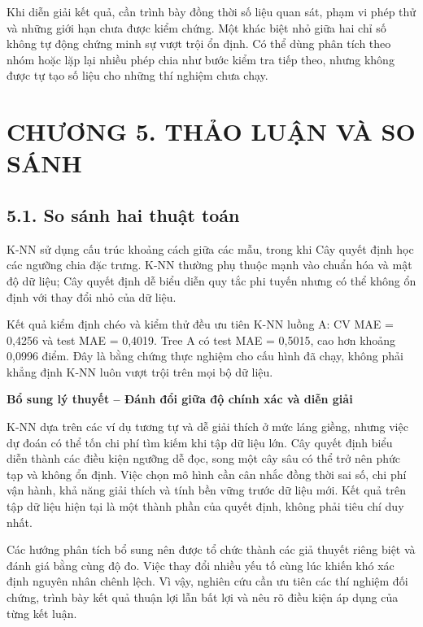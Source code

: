 \documentclass[12pt,a4paper,oneside]{article}
\begin{document}
Khi diễn giải kết quả, cần trình bày đồng thời số liệu quan sát, phạm vi phép thử và những giới hạn chưa được kiểm chứng. Một khác biệt nhỏ giữa hai chỉ số không tự động chứng minh sự vượt trội ổn định. Có thể dùng phân tích theo nhóm hoặc lặp lại nhiều phép chia như bước kiểm tra tiếp theo, nhưng không được tự tạo số liệu cho những thí nghiệm chưa chạy.\par

\clearpage
\section*{CHƯƠNG 5. THẢO LUẬN VÀ SO SÁNH}

\subsection*{5.1. So sánh hai thuật toán}

K-NN sử dụng cấu trúc khoảng cách giữa các mẫu, trong khi Cây quyết định
học các ngưỡng chia đặc trưng. K-NN thường phụ thuộc mạnh vào chuẩn hóa
và mật độ dữ liệu; Cây quyết định dễ biểu diễn quy tắc phi tuyến nhưng
có thể không ổn định với thay đổi nhỏ của dữ liệu.

Kết quả kiểm định chéo và kiểm thử đều ưu tiên K-NN luồng A: CV MAE =
0,4256 và test MAE = 0,4019. Tree A có test MAE = 0,5015, cao hơn khoảng
0,0996 điểm. Đây là bằng chứng thực nghiệm cho cấu hình đã chạy, không
phải khẳng định K-NN luôn vượt trội trên mọi bộ dữ liệu.


\par\noindent\textbf{Bổ sung lý thuyết -- Đánh đổi giữa độ chính xác và diễn giải}\par
K-NN dựa trên các ví dụ tương tự và dễ giải thích ở mức láng giềng, nhưng việc dự đoán có thể tốn chi phí tìm kiếm khi tập dữ liệu lớn. Cây quyết định biểu diễn thành các điều kiện ngưỡng dễ đọc, song một cây sâu có thể trở nên phức tạp và không ổn định. Việc chọn mô hình cần cân nhắc đồng thời sai số, chi phí vận hành, khả năng giải thích và tính bền vững trước dữ liệu mới. Kết quả trên tập dữ liệu hiện tại là một thành phần của quyết định, không phải tiêu chí duy nhất.\par

Các hướng phân tích bổ sung nên được tổ chức thành các giả thuyết riêng biệt và đánh giá bằng cùng độ đo. Việc thay đổi nhiều yếu tố cùng lúc khiến khó xác định nguyên nhân chênh lệch. Vì vậy, nghiên cứu cần ưu tiên các thí nghiệm đối chứng, trình bày kết quả thuận lợi lẫn bất lợi và nêu rõ điều kiện áp dụng của từng kết luận.\par
\end{document}
